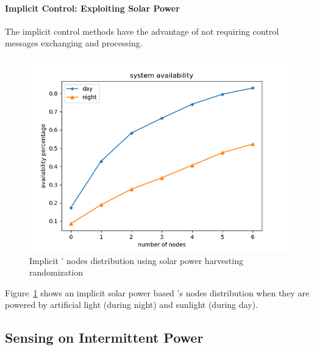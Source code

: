 \paragraph{Implicit Control: Exploiting Solar Power}
%
The implicit control methods have the advantage of not requiring control messages exchanging and processing. 
%
\begin{figure}
	\centering
		\includegraphics[width=\columnwidth]{figures/solarPoweredCoIS.png}
	\caption{Implicit \fullsys' nodes distribution using solar power harvesting randomization}
	\label{fig:solarPwrCoIS}
\end{figure} 

Figure~\ref{fig:solarPwrCoIS} shows an implicit solar power based \sys's nodes distribution when they are powered by artificial light (during night) and sunlight (during day). 





\subsection{Sensing on Intermittent Power}
